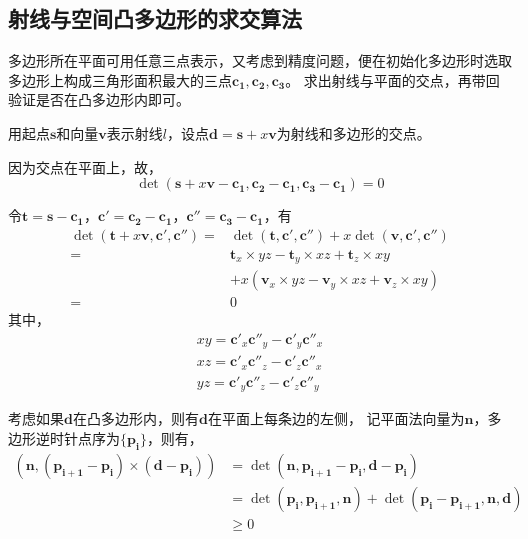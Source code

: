 \documentclass[a4paper,12pt]{article}
\theoremstyle{plain}
\numberwithin{thmdef}{section}
\begin{document}
\subsection{射线与空间凸多边形的求交算法}
多边形所在平面可用任意三点表示，又考虑到精度问题，便在初始化多边形时选取%
多边形上构成三角形面积最大的三点$\mathbf{c_1},\mathbf{c_2},\mathbf{c_3}$。%
求出射线与平面的交点，再带回验证是否在凸多边形内即可。\par
用起点$\mathbf{s}$和向量$\mathbf{v}$表示射线$l$，设点$\mathbf{d}=\mathbf{s}+x%
\mathbf{v}$为射线和多边形的交点。\par
因为交点在平面上，故，
\begin{equation}
\det(\mathbf{s}+x\mathbf{v}-\mathbf{c_1},\mathbf{c_2}-\mathbf{c_1},%
\mathbf{c_3}-\mathbf{c_1})=0
\end{equation}\par
令$\mathbf{t}=\mathbf{s}-\mathbf{c_1}$，$\mathbf{c'}=\mathbf{c_2}-%
\mathbf{c_1}$，$\mathbf{c''}=\mathbf{c_3}-\mathbf{c_1}$，有
\begin{align}
\det(\mathbf{t}+x\mathbf{v},\mathbf{c'},\mathbf{c''})
=&\det(\mathbf{t},\mathbf{c'},\mathbf{c''})+x\det(\mathbf{v},%
\mathbf{c'},\mathbf{c''})\\
=&\mathbf{t}_x\times yz-\mathbf{t}_y\times xz+\mathbf{t}_z\times xy\\
&+x(\mathbf{v}_x\times yz-\mathbf{v}_y\times xz+\mathbf{v}_z\times xy)\\
=&0
\end{align}
其中，
\begin{gather}
xy=\mathbf{c'}_x\mathbf{c''}_y-\mathbf{c'}_y\mathbf{c''}_x\\
xz=\mathbf{c'}_x\mathbf{c''}_z-\mathbf{c'}_z\mathbf{c''}_x\\
yz=\mathbf{c'}_y\mathbf{c''}_z-\mathbf{c'}_z\mathbf{c''}_y
\end{gather}\par
考虑如果$\mathbf{d}$在凸多边形内，则有$\mathbf{d}$在平面上每条边的左侧，%
记平面法向量为$\mathbf{n}$，多边形逆时针点序为$\{\mathbf{p_i}\}$，则有，
\begin{align}
(\mathbf{n},(\mathbf{p_{i+1}}-\mathbf{p_i})\times(\mathbf{d}-\mathbf{p_i}))
&=\det(\mathbf{n},\mathbf{p_{i+1}}-\mathbf{p_i},\mathbf{d}-\mathbf{p_i})\\
&=\det(\mathbf{p_i},\mathbf{p_{i+1}},\mathbf{n})+\det(\mathbf{p_i}-\mathbf{p_{i+1},%
\mathbf{n},\mathbf{d}})\\
&\geqslant 0
\end{align}
\end{document}
